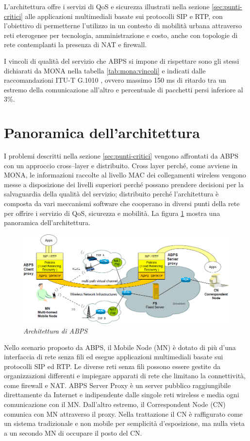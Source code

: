 \documentclass[12pt,a4paper,openright,twoside]{book}
\begin{document}
L'architettura offre i servizi di QoS e sicurezza illustrati nella
sezione \ref{sec:punti-critici} alle applicazioni multimediali basate
sui protocolli SIP e RTP, con l'obiettivo di permetterne l'utilizzo in
un contesto di mobilità urbana attraverso reti eterogenee per
tecnologia, amministrazione e costo, anche con topologie di rete
contemplanti la presenza di NAT e firewall.

I vincoli di qualità del servizio che ABPS si impone di rispettare
sono gli stessi dichiarati da MONA nella tabella
\ref{tab:mona:vincoli} e indicati dalle raccomandazioni ITU-T G.1010
\cite{bib:itu-t}, ovvero massimo 150 ms di ritardo tra un estremo
della comunicazione all'altro e percentuale di pacchetti persi
inferiore al 3\%.

\section {Panoramica dell'architettura}
I problemi descritti nella sezione \ref{sec:punti-critici} vengono
affrontati da ABPS con un approccio cross--layer e distribuito. Cross
layer perché, come avviene in MONA, le informazioni raccolte al
livello MAC dei collegamenti wireless vengono messe a disposizione dei
livelli superiori perché possano prendere decisioni per la
salvaguardia della qualità del servizio; distribuito perché
l'architettura è composta da vari meccanismi software che cooperano in
diversi punti della rete per offrire i servizio di QoS, sicurezza e
mobilità. La figura \ref{fig:abps:arch} mostra una panoramica
dell'architettura.

\begin{figure}
  \centering
  \includegraphics[width=\textwidth]{img/abps-arch}
  \caption{\em Architettura di ABPS}
  \label{fig:abps:arch}
\end{figure}

Nello scenario proposto da ABPS, il Mobile Node (MN) è dotato di più
d'una interfaccia di rete senza fili ed esegue applicazioni
multimediali basate sui protocolli SIP ed RTP. Le diverse reti senza
fili possono essere gestite da organizzazioni differenti e impiegare
apparati di rete che limitano la connettività, come firewall e
NAT. ABPS Server Proxy è un server pubblico raggiungibile direttamente
da Internet e indipendente dalle singole reti wireless e media ogni
comunicazione con il MN. Dall'altro estremo, il Correspondent Node
(CN) comunica con MN attraverso il proxy. Nella trattazione il CN è
raffigurato come un sistema tradizionale e non mobile per semplicità
d'esposizione, ma nulla vieta a un secondo MN di occupare il posto del
CN.
\end{document}
